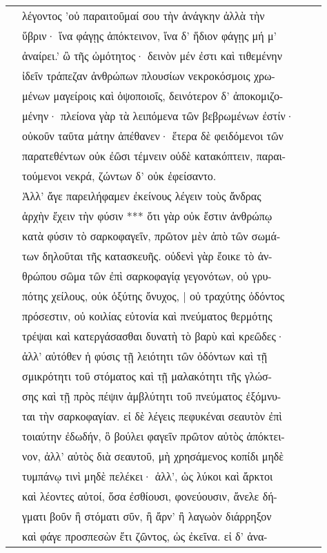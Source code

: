 \documentclass[a4paper,12pt]{article}
\begin{document}
\begin{center}
\begin{xtabular}{p{1cm}p{10.5454545454545cm}p{0.8cm}p{0cm}}
&λέγοντος ’οὐ παραιτοῦμαί σου τὴν ἀνάγκην ἀλλὰ τὴν &&\\
&ὕβριν· ἵνα φάγῃς ἀπόκτεινον, ἵνα δ’ ἥδιον φάγῃς μή μ’ &&\\
&ἀναίρει.’ ὢ τῆς ὠμότητος· δεινὸν μέν ἐστι καὶ τιθεμένην &&\\
&ἰδεῖν τράπεζαν ἀνθρώπων πλουσίων νεκροκόσμοις χρω-&&\\
&μένων μαγείροις καὶ ὀψοποιοῖς, δεινότερον δ’ ἀποκομιζο-&&\\
&μένην· πλείονα γὰρ τὰ λειπόμενα τῶν βεβρωμένων ἐστίν· &&\\
&οὐκοῦν ταῦτα μάτην ἀπέθανεν· ἕτερα δὲ φειδόμενοι τῶν &&\\
&παρατεθέντων οὐκ ἐῶσι τέμνειν οὐδὲ κατακόπτειν, παραι-&&\\
&τούμενοι νεκρά, ζώντων δ’ οὐκ ἐφείσαντο. &&\\
&Ἀλλ’ ἄγε παρειλήφαμεν ἐκείνους λέγειν τοὺς ἄνδρας &&\\
&ἀρχὴν ἔχειν τὴν φύσιν *** ὅτι γὰρ οὐκ ἔστιν ἀνθρώπῳ &&\\
&κατὰ φύσιν τὸ σαρκοφαγεῖν, πρῶτον μὲν ἀπὸ τῶν σωμά-&&\\
&των δηλοῦται τῆς κατασκευῆς. οὐδενὶ γὰρ ἔοικε τὸ ἀν-&&\\
&θρώπου σῶμα τῶν ἐπὶ σαρκοφαγίᾳ γεγονότων, οὐ γρυ-&&\\
&πότης χείλους, οὐκ ὀξύτης ὄνυχος, | οὐ τραχύτης ὀδόντος  &&\\
&πρόσεστιν, οὐ κοιλίας εὐτονία καὶ πνεύματος θερμότης &&\\
&τρέψαι καὶ κατεργάσασθαι δυνατὴ τὸ βαρὺ καὶ κρεῶδες· &&\\
&ἀλλ’ αὐτόθεν ἡ φύσις τῇ λειότητι τῶν ὀδόντων καὶ τῇ &&\\
&σμικρότητι τοῦ στόματος καὶ τῇ μαλακότητι τῆς γλώσ-&&\\
&σης καὶ τῇ πρὸς πέψιν ἀμβλύτητι τοῦ πνεύματος ἐξόμνυ-&&\\
&ται τὴν σαρκοφαγίαν. εἰ δὲ λέγεις πεφυκέναι σεαυτὸν ἐπὶ &&\\
&τοιαύτην ἐδωδήν, ὃ βούλει φαγεῖν πρῶτον αὐτὸς ἀπόκτει-&&\\
&νον, ἀλλ’ αὐτὸς διὰ σεαυτοῦ, μὴ χρησάμενος κοπίδι μηδὲ &&\\
&τυμπάνῳ τινὶ μηδὲ πελέκει· ἀλλ’, ὡς λύκοι καὶ ἄρκτοι &&\\
&καὶ λέοντες αὐτοί, ὅσα ἐσθίουσι, φονεύουσιν, ἄνελε δή-&&\\
&γματι βοῦν ἢ στόματι σῦν, ἢ ἄρν’ ἢ λαγωὸν διάρρηξον &&\\
&καὶ φάγε προσπεσὼν ἔτι ζῶντος, ὡς ἐκεῖνα. εἰ δ’ ἀνα-&&\\

\end{xtabular}
\end{center}
\end{document}
